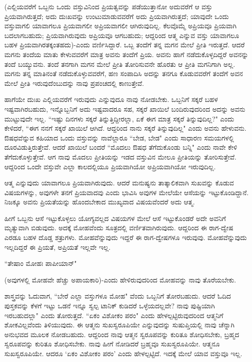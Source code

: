 (ಎಲ್ಲಿಯವರೆಗೆ ಒಬ್ಬನು ಒಂದು ವಸ್ತುವಿನಿಂದ ಪ್ರಿಯತ್ವವನ್ನು ಪಡೆಯುತ್ತಾನೋ ಅದುವರೆಗೆ ಆ ವಸ್ತು ಪ್ರಿಯವಾಗಿರುತ್ತದೆ; ಅದು ದುಃಖವನ್ನು ಉಂಟುಮಾಡುವವರೆಗೆ ಅದು ಪ್ರಿಯವಾಗಿರುತ್ತದೆ; ಯಾವುದೇ ಒಂದು ವಸ್ತುವಾಗಲಿ ಯಾವಾಗಲೂ ಪ್ರಿಯವಾಗಲೀ ಅಪ್ರಿಯವಾಗಲೀ ಆಗಿರುವುದಿಲ್ಲ. ಕೆಲವೊಮ್ಮೆ ಅಪ್ರಿಯವೂ ಪ್ರಿಯವಾಗಿ ಬದಲಾಗಬಹುದು; ಪ್ರಿಯವಾಗಿರುವುದು ಅಪ್ರಿಯವೂ ಆಗಬಹುದು; ಆದ್ದರಿಂದ ಆತ್ಮ ಎನ್ನುವ ವಸ್ತು ಯಾವಾಗಲೂ ಬಹಳ ಪ್ರಿಯವಾಗಿರತಕ್ಕಂತಹದು)-ಎಂದು ವರ್ಣಿಸಿದ್ದಾರೆ. ಒಬ್ಬ ತಂದೆಗೆ ತನ್ನ ಮಗನ ಮೇಲೆ ಪ್ರೀತಿ ಇರುತ್ತದೆ. ಆದರೆ ಮಗನು ತಂದೆಯ ಮಾತು ಕೇಳುವವರೆಗೆ ಮಾತ್ರ ಅವನು ತಂದೆಗೆ ಪ್ರಿಯ. ಅವನು ಹಾಗೆ ನಡೆದುಕೊಳ್ಳದಿದ್ದರೆ ಅವನನ್ನು ತಂದೆ ಬಯ್ಯುವನು. ತಂದೆ ತನಗಾಗಿ ಮಗನ ಮೇಲೆ ಪ್ರೀತಿ ತೋರಿಸುವನೇ ಹೊರತು ಆ ಪ್ರೀತಿ ಮಗನಿಗಾಗಿ ಅಲ್ಲ. ಮಗನು ತನ್ನ ಮಾತಿನಂತೆ ನಡೆದುಕೊಳ್ಳುವವರೆಗೆ, ಹಣ ಸಂಪಾದಿಸಿ ಅದನ್ನು ತನಗೂ ಕೊಡುವವರೆಗೆ ತಂದೆಗೆ ಅವನ ಮೇಲೆ ಪ್ರೀತಿ ಇರುವುದೆಂಬುದನ್ನು ನಾವು ಪ್ರಪಂಚದಲ್ಲಿ ಕಾಣುತ್ತೇವೆ.

ಹಾಗೆಯೇ ದುಃಖ ಎಲ್ಲಿಯವರೆಗೆ ಇರುವುದು ಎನ್ನುವುದೂ ನಾವು ನೋಡಬೇಕು. ಒಬ್ಬನಿಗೆ ಸಕ್ಕರೆ ಬಹಳ ಇಷ್ಟವಾಗಿರಬಹುದು, ಇನ್ನೊಬ್ಬನಿಗೆ ಅದು ಇಷ್ಟವಾದರೂ ಸಹ, ಸಕ್ಕರೆ ಖಾಯಿಲೆ ಬಂದಿರುವುದರಿಂದ ಅದನ್ನು ಅವನು ಮುಟ್ಟುವುದೇ ಇಲ್ಲ. ``ಇಷ್ಟು ದಿನಗಳು ಸಕ್ಕರೆ ತಿನ್ನುತ್ತಿದ್ದೀರಲ್ಲಾ, ಏಕೆ ಈಗ ಮಾತ್ರ ಸಕ್ಕರೆ ತಿನ್ನುವುದಿಲ್ಲ?" ಎಂದು ಕೇಳಿದರೆ, ``ಈಗ ನನಗೆ ಸಕ್ಕರೆ ಖಾಯಿಲೆ ಆಗಿದೆ. ಆದ್ದರಿಂದ ನಾನು ಸಕ್ಕರೆ ತಿನ್ನುವುದಿಲ್ಲ" ಎಂದು ಅವನು ಹೇಳುವನು. ಔಷಧವೆನ್ನುವ ಕಹಿಯಾದ ಒಂದು ವಸ್ತುವನ್ನು ನಾವೆಲ್ಲಾರೂ ``ಬೇಡ, ಬೇಡ" ಎಂದು ಸಾಧಾರಣ ಸಮಯಗಳಲ್ಲಿ ದೂರವಿಡುತ್ತಿರುತ್ತೇವೆ. ಆದರೆ ಖಾಯಿಲೆ ಬಂದರೆ ``ಮೊದಲು ಔಷಧ ತೆಗೆದುಕೊಂಡು ಬನ್ನಿ" ಎಂದು ನಾವೇ ಕೇಳಿ ತೆಗೆದುಕೊಳ್ಳುತ್ತೇವೆ. ಆಗ ನಾವು ಮೊದಲು ಪ್ರೀತಿಯನ್ನು ಇಡದ ವಸ್ತುವಿನ ಮೇಲೂ ಪ್ರೀತಿಯನ್ನು ತೋರಿಸುತ್ತೇವೆ. ಆದ್ದರಿಂದ ಒಂದೇ ವಸ್ತುವೇ ಎಲ್ಲಾ ಕಾಲದಲ್ಲಿಯೂ ಪ್ರಿಯವಾಗಿಯೋ ಅಪ್ರಿಯವಾಗಿಯೋ ಇರುವುದಿಲ್ಲ.

ಆತ್ಮ ಎನ್ನುವುದು ಯಾವಾಗಲೂ ಪ್ರಿಯವಾಗಿರುವುದು. ಆದರೆ ಮನುಷ್ಯನು ತಾತ್ಕಾಲಿಕವಾಗಿ ಸುಖವನ್ನು ಕೊಡುವ ವಿಷಯಗಳನ್ನು, ಅವುಗಳೇ ತನಗೆ ಪ್ರಿಯವಾದವು ಎಂದು ಭಾವಿಸಿ ಅವುಗಳ ಮೇಲೆಯೇ ಆಸೆಯನ್ನು ಇಟ್ಟುಕೊಂಡಿದ್ದಾನೆ. ನಿಜಕ್ಕೂ ಅವನು ಪ್ರಿಯತೆಯನ್ನು ಹೊಂದಬೇಕಾದ ಮುಖ್ಯವಾದ ವಿಷಯವೆಂದರೆ ಅದು ಆತ್ಮ.

ಹೀಗೆ ಒಬ್ಬನು ಆಸೆ ಇಟ್ಟುಕೊಳ್ಳಲು ಯೋಗ್ಯವಲ್ಲದ ವಿಷಯಗಳ ಮೇಲೆ ಆಸೆ ಇಟ್ಟುಕೊಂಡರೆ ಅದೇ ಅವನಿಗೆ ಮೃತ್ಯುವಾಗಿ ಬಿಡುವುದು. ಅದಕ್ಕೆ ಮೋಹವೆಂದು ಸೂತ್ರದಲ್ಲಿ ವರ್ಣಿತವಾಗಿರುವುದು. ಆದ್ದರಿಂದ ಈ ರಾಗ-ದ್ವೇಷ ಎರಡೂ ಬಹಳ ದೊಡ್ಡ ಶತ್ರುಗಳು. ಮೋಹವೆನ್ನುವುದು ಇದ್ದರೆ ಈ ರಾಗ-ದ್ವೇಷಗಳೂ ಇರುವುವು. ಮೋಹವೆನ್ನುವುದು ಇಲ್ಲದಿದ್ದರೆ ಈ ಪ್ರಿಯತೆ, ಅಪ್ರಿಯತೆ ಇಲ್ಲವೇ ಇಲ್ಲ.

\begin{shloka}
``ತೇಷಾಂ ಮೋಹಃ ಪಾಪೀಯಾನ್"
\end{shloka}

(ಅವುಗಳಲ್ಲಿ ಮೋಹವೇ ಹೆಚ್ಚು ಅಪಾಯಕಾರಿ)-ಎಂದು ಹೇಳಿರುವುದರಿಂದ ಮೋಹವನ್ನು ನಾವು ತೊರೆಯಬೇಕು.

ಶಾಸ್ತ್ರವನ್ನು ಓದುವಾಗ, ``ಬೇರೆ ಎಲ್ಲಾ ವಸ್ತುಗಳೂ ಮೋಹ" ವೆಂದು ಒಬ್ಬನಿಗೆ ತೋರಬಹುದು. ಆದರೆ ಓದಿದ ಪುಸ್ತಕವನ್ನು ಕೆಳಗೆ ಇಟ್ಟು ಒಡನೆ ಇನ್ನೂ ಸ್ವಲ್ಪ ಟಾನಿಕ್ ಕುಡಿದರೆ ಒಳ್ಳೆಯದಲ್ಲವೇ? ನಾವು ಪುಷ್ಟಿಯಾಗಿ ಇರಬಹುದಲ್ಲಾ" ಎಂದು ತೋರುತ್ತದೆ. ``ಏಕಂ ವಿಶೋಕಂ ಪರಂ" ಎಂದು ಹೇಳಲ್ಪಟ್ಟಿರುವುದರಿಂದ ಆತ್ಮನಿಗೆ ಶೋಕವಿಲ್ಲವೆಂದು ತಿಳಿಯುವುದು. ಈ ಆತ್ಮನು ಸುಖಸ್ವರೂಪಿಯೇ ಎನ್ನುವುದನ್ನು ಸುಷುಪ್ತಿಯಲ್ಲಿ ನಾವು ಚೆನ್ನಾಗಿ ಅನುಭವದ ಮೂಲಕ ನೋಡಬಹುದು. ಆದ್ದರಿಂದ ನಾವು ಆತ್ಮನ ಸ್ವರೂಪವನ್ನು ಕುರಿತೂ ಶೋಧಿಸಬೇಕು, ಬ್ರಹ್ಮದ ಸ್ವರೂಪವನ್ನು ಕುರಿತೂ ಶೋಧಿಸಬೇಕು. ನಾವು ಹೀಗೆ ನೋಡಿದರೆ ಬ್ರಹ್ಮವೂ ಸುಖಸ್ವರೂಪಿಯೇ. ಆತ್ಮನೂ ಸುಖಸ್ವರೂಪಿಯೇ. ಆದರೂ `ಏಕಂ ವಿಶೋಕಂ ಪರಂ' ಎಂದು ಹೇಳಲ್ಪಟ್ಟಿದೆ. ಇದಕ್ಕೆ ಮೇಲೆ ಯಾವ ವಸ್ತುವೂ ಇಲ್ಲ.

